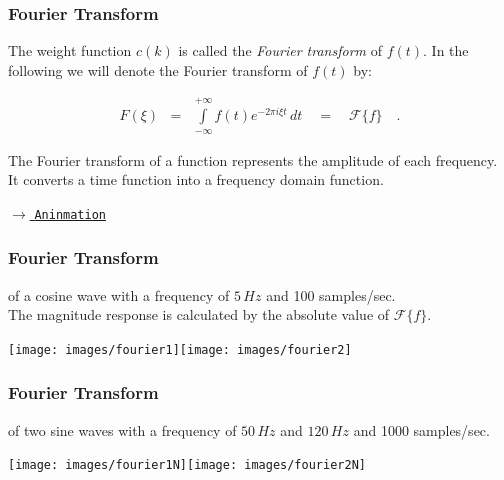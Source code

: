 \begin{frame}
    \frametitle{Fourier Transform}

    \begin{myDefinition}

        The weight function $c(k)$ is called the \textit{Fourier transform} of $f(t)$. In the following we will denote the Fourier transform of $f(t)$ by:

        \begin{eqnarray*}
            F(\xi)&=& \int\limits_{-\infty}^{+\infty} f(t) e^{-2\pi i\xi t} \, dt\quad =
            \quad  \mathcal{F}\{f\}\quad .
        \end{eqnarray*}

        The Fourier transform of a function represents the amplitude of each frequency. It converts a time function into a frequency domain function.

    \end{myDefinition}
    \vspace{1cm}

    \begin{flushright}
        \href{https://upload.wikimedia.org/wikipedia/commons/a/a3/Continuous_Fourier_transform_of_rect_and_sinc_functions.gif}{$\longrightarrow$ \texttt{Aninmation}}
    \end{flushright}

\end{frame}



\begin{frame}
    \frametitle{Fourier Transform}
    \myExample of a cosine wave with a frequency of $5\,Hz$ and 100 samples/sec.\\
    The magnitude response is calculated by the absolute value of $\mathcal{F}\{f\}$.

    \begin{center}
        \texttt{[image: images/fourier1]}\texttt{[image: images/fourier2]}
    \end{center}
\end{frame}



\begin{frame}
    \frametitle{Fourier Transform}
    \myExample of two sine waves with a frequency of $50\,Hz$ and $120\,Hz$ and 1000 samples/sec.\newline

    \begin{center}
        \texttt{[image: images/fourier1N]}\texttt{[image: images/fourier2N]}
    \end{center}
\end{frame}

